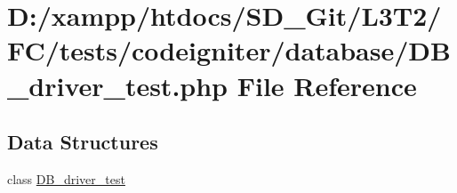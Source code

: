 \hypertarget{tests_2codeigniter_2database_2_d_b__driver__test_8php}{}\section{D\+:/xampp/htdocs/\+S\+D\+\_\+\+Git/\+L3\+T2/\+F\+C/tests/codeigniter/database/\+D\+B\+\_\+driver\+\_\+test.php File Reference}
\label{tests_2codeigniter_2database_2_d_b__driver__test_8php}
\subsection*{Data Structures}
\begin{DoxyCompactItemize}
\item 
class \hyperlink{class_d_b__driver__test}{D\+B\+\_\+driver\+\_\+test}
\end{DoxyCompactItemize}
